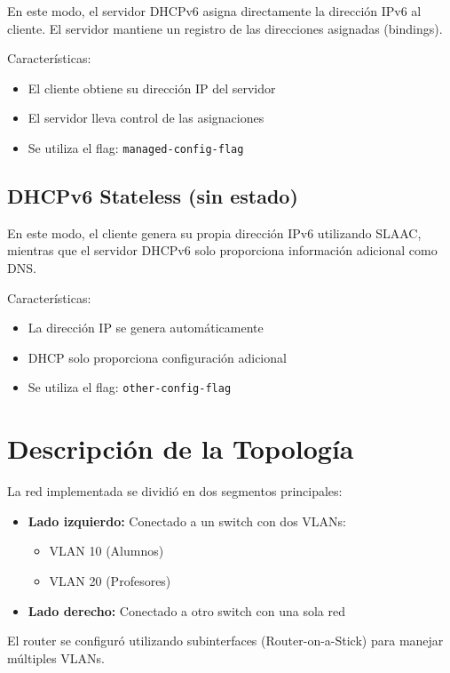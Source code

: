 \documentclass[12pt]{article}
\begin{document}
En este modo, el servidor DHCPv6 asigna directamente la dirección IPv6 al cliente. El servidor mantiene un registro de las direcciones asignadas (bindings).

Características:
\begin{itemize}
    \item El cliente obtiene su dirección IP del servidor
    \item El servidor lleva control de las asignaciones
    \item Se utiliza el flag: \texttt{managed-config-flag}
\end{itemize}

\subsection{DHCPv6 Stateless (sin estado)}

En este modo, el cliente genera su propia dirección IPv6 utilizando SLAAC, mientras que el servidor DHCPv6 solo proporciona información adicional como DNS.

Características:
\begin{itemize}
    \item La dirección IP se genera automáticamente
    \item DHCP solo proporciona configuración adicional
    \item Se utiliza el flag: \texttt{other-config-flag}
\end{itemize}

\section{Descripción de la Topología}

La red implementada se dividió en dos segmentos principales:

\begin{itemize}
    \item \textbf{Lado izquierdo:} Conectado a un switch con dos VLANs:
    \begin{itemize}
        \item VLAN 10 (Alumnos)
        \item VLAN 20 (Profesores)
    \end{itemize}
    
    \item \textbf{Lado derecho:} Conectado a otro switch con una sola red
\end{itemize}

El router se configuró utilizando subinterfaces (Router-on-a-Stick) para manejar múltiples VLANs.
\end{document}
